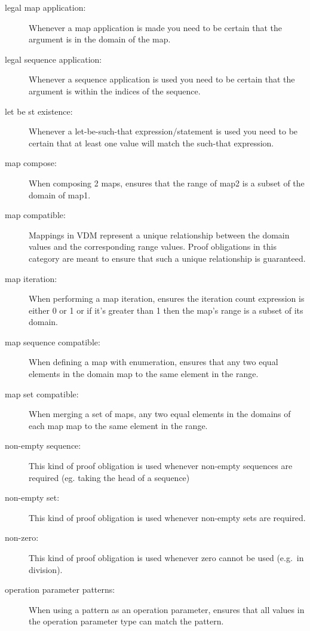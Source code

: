 \begin{description}
\item[legal map application:] Whenever a map application is made you need to be
  certain that the argument is in the domain of the map.

\item[legal sequence application:] Whenever a sequence application is used you need to be
  certain that the argument is within the indices of the sequence.

\item[let be st existence:] Whenever a let-be-such-that
  expression/statement is used you need to be certain that at least one value
  will match the such-that expression.

\item[map compose:] When composing 2 maps, ensures that the
range of map2 is a subset of the domain of map1. 

\item[map compatible:] Mappings in VDM represent a unique relationship
  between the domain values and the corresponding range values. Proof
  obligations in this category are meant to ensure that such a unique
  relationship is guaranteed.

\item[map iteration:] When performing a map iteration, ensures the iteration
    count expression is either 0 or 1 or if it's greater than 1 then the map's
    range is a subset of its domain. 

\item[map sequence compatible:] When defining a map with enumeration, ensures that
    any two equal elements in the domain map to the same element in the range.

\item[map set compatible:] When merging a set of maps, any two equal elements in
    the domains of each map map to the same element in the range.

\item[non-empty sequence:] This kind of proof obligation is used whenever
  non-empty sequences are required (eg. taking the head of a sequence)

\item[non-empty set:] This kind of proof obligation is used whenever
  non-empty sets are required.

\item[non-zero:] This kind of proof obligation is used whenever zero
  cannot be used (e.g.\ in division).

\item[operation parameter patterns:] When using a pattern as an operation
    parameter, ensures that all values in the operation parameter type can
    match the pattern.


\end{description}
